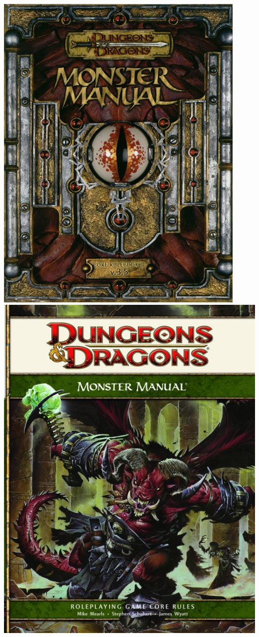 \documentclass{beamer}\usepackage{graphicx, color}
\begin{document}
\begin{frame}
\begin{center}
  \includegraphics[height = 0.4\textheight, keepaspectratio = true]{mm35}\hspace{0.2\textwidth}%
  \includegraphics[height = 0.4\textheight, keepaspectratio = true]{mm4}\par
  \end{center}
  

\end{frame}
\end{document}
